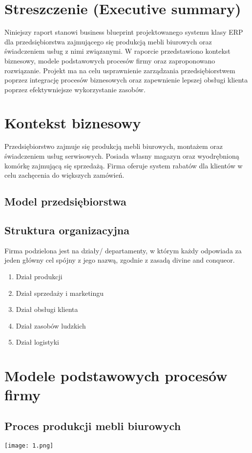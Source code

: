 \section{Streszczenie (Executive summary)}
Niniejszy raport stanowi business blueprint projektowanego systemu
klasy ERP dla przedsiębiorstwa zajmującego się produkcją mebli biurowych
oraz świadczeniem usług z nimi związanymi. W raporcie przedstawiono kontekst
biznesowy, modele podstawowych procesów firmy oraz zaproponowano rozwiązanie.
Projekt ma na celu usprawnienie zarządzania
przedsiębiorstwem poprzez integrację procesów biznesowych oraz zapewnienie lepszej
obsługi klienta poprzez efektywniejsze wykorzystanie zasobów.

\section{Kontekst biznesowy}
Przedsiębiorstwo zajmuje się produkcją mebli biurowych,
montażem oraz świadczeniem usług serwisowych. Posiada własny magazyn
oraz wyodrębnioną komórkę zajmującą się sprzedażą.
Firma oferuje system rabatów dla klientów w celu zachęcenia do większych zamówień.
\subsection{Model przedsiębiorstwa}

\subsection{Struktura organizacyjna}
Firma podzielona jest na działy/ departamenty,
w którym każdy odpowiada za jeden główny cel spójny z jego nazwą,
zgodnie z zasadą divine and conqueor.
\begin{enumerate}
    \item Dział produkcji
    \item Dział sprzedaży i marketingu
    \item Dział obsługi klienta
    \item Dział zasobów ludzkich
    \item Dział logistyki
\end{enumerate}

\section{Modele podstawowych procesów firmy}
\subsection{Proces produkcji mebli biurowych}
\begin{center}
    \texttt{[image: 1.png]}\\[0.5cm]
\end{center}
